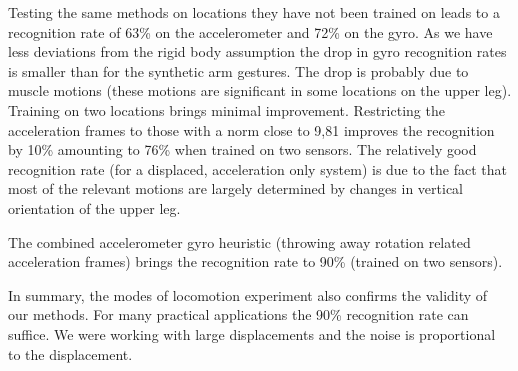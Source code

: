 Testing the same methods on locations they have not been
trained on leads to a recognition rate of 63\% on the accelerometer and
72\% on the gyro. As we have less deviations from the
rigid body assumption the drop in gyro recognition rates is smaller
than for the synthetic arm gestures. The drop is
probably due to muscle motions (these motions are significant in some
locations on the upper leg). Training on two locations brings minimal
improvement. Restricting the acceleration frames to those with a norm
close to 9,81 improves the recognition by 10\% amounting to 76\% when
trained on two sensors.  The relatively good recognition rate (for a
displaced, acceleration only system) is due to the fact that most of the relevant motions are largely
determined by changes in vertical orientation of the upper leg.

The combined accelerometer gyro heuristic (throwing away rotation
related acceleration frames) brings the recognition rate to 90\%
(trained on two sensors).

In summary, the modes of locomotion experiment also confirms the
validity of our methods. For many practical applications the 90\%
recognition rate can suffice. We were working with large displacements 
and the noise is proportional to the displacement.

\begin{table}
\centering
\caption[Confusion matrix trained on two sensors]{Joint Accleerometer and Gyro trained on two sensors, evaluated on three, 90 \% decision boundary at 150. }
\end{table}

